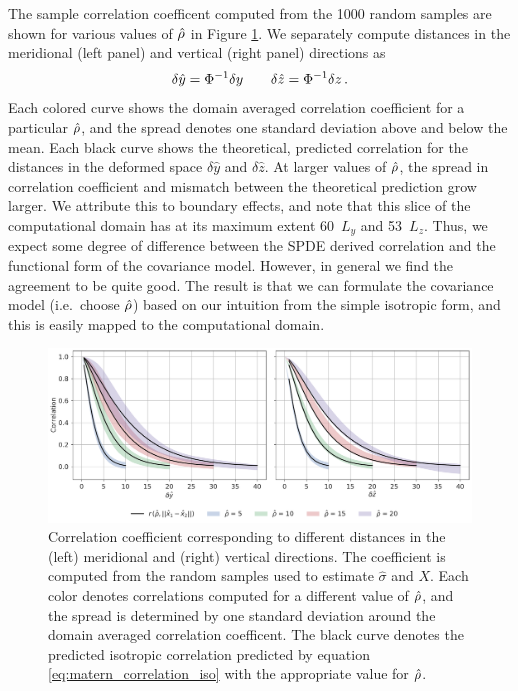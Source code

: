The sample correlation coefficent computed from the 1000 random samples are
shown for various values of $\hat{\rho}$ in Figure \ref{fig:matern_correlations}.
We separately compute distances in the meridional (left panel) and vertical
(right panel) directions as
\begin{equation*}
    \delta \hat{y} = \Phi^{-1}\delta y
    \qquad
    \delta \hat{z} = \Phi^{-1}\delta z \, .
\end{equation*}
Each colored curve shows the domain averaged correlation coefficient for a
particular $\hat{\rho}$, and the spread denotes one standard deviation above and
below the mean.
Each black curve shows the theoretical, predicted correlation for the distances
in the deformed space $\delta\hat{y}$ and $\delta\hat{z}$.
At larger values of $\hat{\rho}$, the spread in correlation coefficient and
mismatch between the theoretical prediction grow larger.
We attribute this to boundary effects, and note that this slice of the
computational domain has at its maximum extent 60~$L_y$ and 53~$L_z$.
Thus, we expect some degree of difference between the SPDE derived correlation
and the functional form of the covariance model.
However, in general we find the agreement to be quite good.
The result is that we can formulate the covariance model (i.e.\ choose
$\hat{\rho}$) based on our intuition from the simple isotropic form, and this is
easily mapped to the computational domain.

\begin{figure}
    \centering
    \includegraphics[width=\textwidth]{../figures/nondimensional_correlation.pdf}
    \caption{Correlation coefficient corresponding to different distances in the
        (left) meridional and (right) vertical directions. The coefficient is
        computed from the random samples used to estimate
        $\hat{\sigma}$ and $X$. Each color denotes correlations computed for a
        different value of $\hat{\rho}$, and the spread is determined by one standard
        deviation around the domain averaged correlation coefficent.
        The black curve denotes the predicted isotropic correlation predicted by
        equation \eqref{eq:matern_correlation_iso} with the appropriate value for
        $\hat{\rho}$.}
    \label{fig:matern_correlations}
\end{figure}
